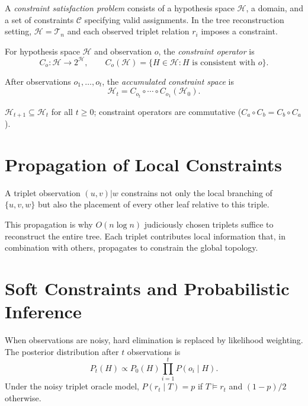 A \emph{constraint satisfaction problem} consists of a hypothesis space $\mathcal{H}$, a domain, and a set of constraints $\mathcal{C}$ specifying valid assignments. In the tree reconstruction setting, $\mathcal{H} = \mathcal{T}_n$ and each observed triplet relation $r_i$ imposes a constraint.

\begin{definition}
For hypothesis space $\mathcal{H}$ and observation $o$, the \emph{constraint operator} is
\[
C_o : \mathcal{H} \to 2^{\mathcal{H}}, \qquad C_o(\mathcal{H}) = \{H \in \mathcal{H} : H \text{ is consistent with } o\}.
\]
\end{definition}

\begin{definition}
After observations $o_1, \ldots, o_t$, the \emph{accumulated constraint space} is
\[
\mathcal{H}_t = C_{o_t} \circ \cdots \circ C_{o_1}(\mathcal{H}_0).
\]
\end{definition}

\begin{proposition}
$\mathcal{H}_{t+1} \subseteq \mathcal{H}_t$ for all $t \geq 0$; constraint operators are commutative ($C_a \circ C_b = C_b \circ C_a$).
\end{proposition}

\section{Propagation of Local Constraints}

\begin{proposition}
\label{prop:triplet_propagation}
A triplet observation $(u,v)|w$ constrains not only the local branching of $\{u,v,w\}$ but also the placement of every other leaf relative to this triple.
\end{proposition}

This propagation is why $O(n \log n)$ judiciously chosen triplets suffice to reconstruct the entire tree. Each triplet contributes local information that, in combination with others, propagates to constrain the global topology.

\section{Soft Constraints and Probabilistic Inference}

When observations are noisy, hard elimination is replaced by likelihood weighting. The posterior distribution after $t$ observations is
\[
P_t(H) \propto P_0(H) \prod_{i=1}^t P(o_i \mid H).
\]
Under the noisy triplet oracle model, $P(r_t \mid T) = p$ if $T \models r_t$ and $(1-p)/2$ otherwise.

